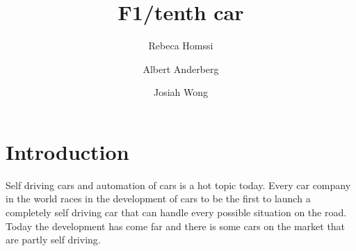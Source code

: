 \documentclass{LTHtwocol} %
\begin{document}
\begin{frontmatter}
\title{F1/tenth car} %

\author[Rebeca]{Rebeca Homssi}
\author[Albert]{Albert Anderberg}
\author[Josiah]{Josiah Wong}




\end{frontmatter}


\section{Introduction}

Self driving cars and automation of cars is a hot topic today. Every car company in the world races in the development of cars to be the first to launch a completely self driving car that can handle every possible situation on the road. Today the development has come far and there is some cars on the market that are partly self driving.
\end{document}
